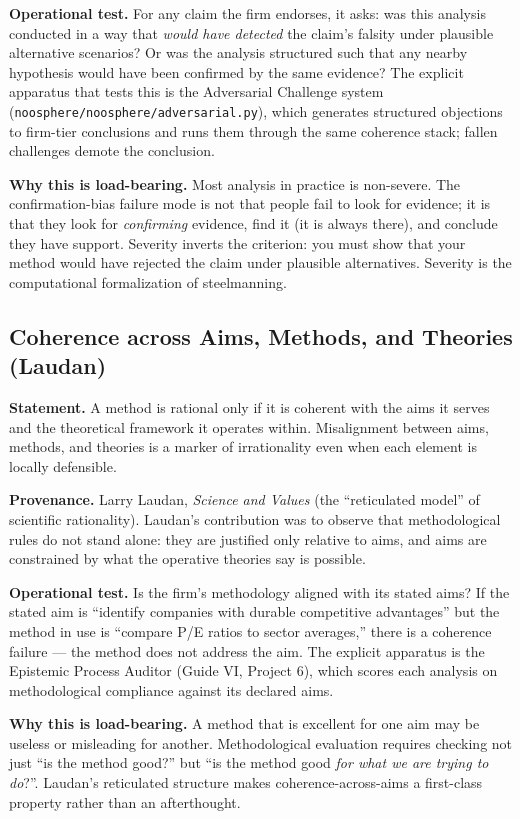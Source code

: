 \documentclass[11pt,letterpaper]{article}
\newcommand{\file}[1]{\texttt{#1}}
\begin{document}
\textbf{Operational test.} For any claim the firm endorses, it asks: was this analysis conducted in a way that \emph{would have detected} the claim's falsity under plausible alternative scenarios? Or was the analysis structured such that any nearby hypothesis would have been confirmed by the same evidence? The explicit apparatus that tests this is the Adversarial Challenge system (\file{noosphere/noosphere/adversarial.py}), which generates structured objections to firm-tier conclusions and runs them through the same coherence stack; fallen challenges demote the conclusion.

\textbf{Why this is load-bearing.} Most analysis in practice is non-severe. The confirmation-bias failure mode is not that people fail to look for evidence; it is that they look for \emph{confirming} evidence, find it (it is always there), and conclude they have support. Severity inverts the criterion: you must show that your method would have rejected the claim under plausible alternatives. Severity is the computational formalization of steelmanning.

\subsection{Coherence across Aims, Methods, and Theories (Laudan)}

\textbf{Statement.} A method is rational only if it is coherent with the aims it serves and the theoretical framework it operates within. Misalignment between aims, methods, and theories is a marker of irrationality even when each element is locally defensible.

\textbf{Provenance.} Larry Laudan, \textit{Science and Values} (the ``reticulated model'' of scientific rationality). Laudan's contribution was to observe that methodological rules do not stand alone: they are justified only relative to aims, and aims are constrained by what the operative theories say is possible.

\textbf{Operational test.} Is the firm's methodology aligned with its stated aims? If the stated aim is ``identify companies with durable competitive advantages'' but the method in use is ``compare P/E ratios to sector averages,'' there is a coherence failure --- the method does not address the aim. The explicit apparatus is the Epistemic Process Auditor (Guide VI, Project 6), which scores each analysis on methodological compliance against its declared aims.

\textbf{Why this is load-bearing.} A method that is excellent for one aim may be useless or misleading for another. Methodological evaluation requires checking not just ``is the method good?'' but ``is the method good \emph{for what we are trying to do}?''. Laudan's reticulated structure makes coherence-across-aims a first-class property rather than an afterthought.
\end{document}
